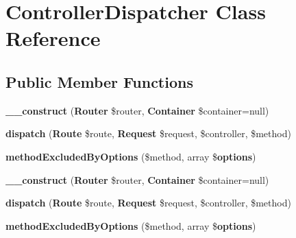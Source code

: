\section{Controller\+Dispatcher Class Reference}
\label{class_illuminate_1_1_routing_1_1_controller_dispatcher}
\subsection*{Public Member Functions}
\begin{DoxyCompactItemize}
\item 
{\bf \+\_\+\+\_\+construct} ({\bf Router} \$router, {\bf Container} \$container=null)
\item 
{\bf dispatch} ({\bf Route} \$route, {\bf Request} \$request, \$controller, \$method)
\item 
{\bf method\+Excluded\+By\+Options} (\$method, array \${\bf options})
\item 
{\bf \+\_\+\+\_\+construct} ({\bf Router} \$router, {\bf Container} \$container=null)
\item 
{\bf dispatch} ({\bf Route} \$route, {\bf Request} \$request, \$controller, \$method)
\item 
{\bf method\+Excluded\+By\+Options} (\$method, array \${\bf options})
\end{DoxyCompactItemize}
